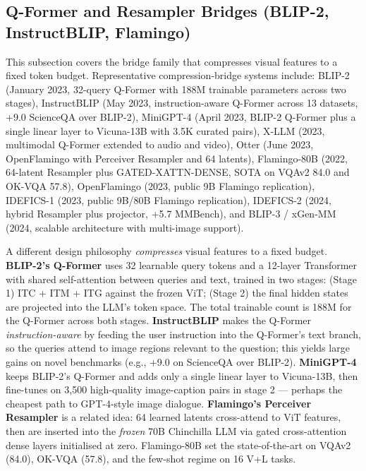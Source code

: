 \documentclass{article}
\begin{document}
\subsection{Q-Former and Resampler Bridges (BLIP-2, InstructBLIP, Flamingo)}\label{q-former-and-resampler-bridges-blip-2-instructblip-flamingo}

This subsection covers the bridge family that compresses visual features to a fixed token budget. Representative compression-bridge systems include: BLIP-2 (January 2023, 32-query Q-Former with 188M trainable parameters across two stages), InstructBLIP (May 2023, instruction-aware Q-Former across 13 datasets, +9.0 ScienceQA over BLIP-2), MiniGPT-4 (April 2023, BLIP-2 Q-Former plus a single linear layer to Vicuna-13B with 3.5K curated pairs), X-LLM (2023, multimodal Q-Former extended to audio and video), Otter (June 2023, OpenFlamingo with Perceiver Resampler and 64 latents), Flamingo-80B (2022, 64-latent Resampler plus GATED-XATTN-DENSE, SOTA on VQAv2 84.0 and OK-VQA 57.8), OpenFlamingo (2023, public 9B Flamingo replication), IDEFICS-1 (2023, public 9B/80B Flamingo replication), IDEFICS-2 (2024, hybrid Resampler plus projector, +5.7 MMBench), and BLIP-3 / xGen-MM (2024, scalable architecture with multi-image support).

A different design philosophy \emph{compresses} visual features to a fixed budget. \textbf{BLIP-2's Q-Former} \citep{li2023blip2bootstrapping} uses 32 learnable query tokens and a 12-layer Transformer with shared self-attention between queries and text, trained in two stages: (Stage 1) ITC + ITM + ITG against the frozen ViT; (Stage 2) the final hidden states are projected into the LLM's token space. The total trainable count is 188M for the Q-Former across both stages. \textbf{InstructBLIP} \citep{dai20232023} makes the Q-Former \emph{instruction-aware} by feeding the user instruction into the Q-Former's text branch, so the queries attend to image regions relevant to the question; this yields large gains on novel benchmarks (e.g., +9.0 on ScienceQA over BLIP-2). \textbf{MiniGPT-4} keeps BLIP-2's Q-Former and adds only a single linear layer to Vicuna-13B, then fine-tunes on 3,500 high-quality image-caption pairs in stage 2 --- perhaps the cheapest path to GPT-4-style image dialogue. \textbf{Flamingo's Perceiver Resampler} is a related idea: 64 learned latents cross-attend to ViT features, then are inserted into the \emph{frozen} 70B Chinchilla LLM via gated cross-attention dense layers initialised at zero. Flamingo-80B set the state-of-the-art on VQAv2 (84.0), OK-VQA (57.8), and the few-shot regime on 16 V+L tasks.
\end{document}
